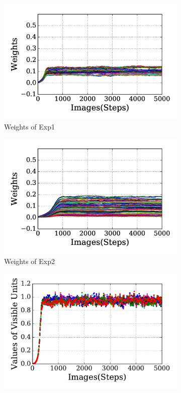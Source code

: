 \begin{figure}
	\centering
	\begin{subfigure}[t]{0.45\textwidth}
		\includegraphics[width=\textwidth]{pics_sdlm/31_exp_RBM_noise/exp1_weights_s.png}
		\caption{Weights of Exp1}
	\end{subfigure}
	\begin{subfigure}[t]{0.45\textwidth}
		\includegraphics[width=\textwidth]{pics_sdlm/31_exp_RBM_noise/exp2_weights_s.png}
		\caption{Weights of Exp2}
	\end{subfigure}
	\begin{subfigure}[t]{0.45\textwidth}
		\includegraphics[width=\textwidth]{pics_sdlm/31_exp_RBM_noise/exp1_recon_s.pdf}

\end{subfigure}
\end{figure}
